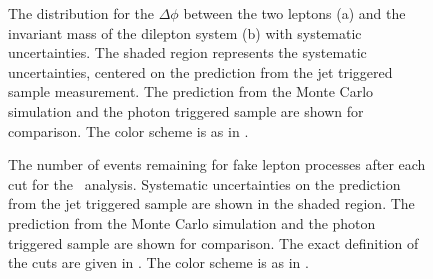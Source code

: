 \documentclass{cmspaper}
\begin{document}
\begin{figure}[htb]
  \begin{center}
    \caption{The distribution for the $\Delta\phi$ between the two leptons (a) and the invariant mass of the dilepton system (b) with systematic uncertainties. The shaded region represents the systematic uncertainties, centered on the prediction from the jet triggered sample measurement. The prediction from the Monte Carlo simulation and the photon triggered sample are shown for comparison. The color  scheme is as in .}
    \label{fig:DeltaPhiDileptonMass_WithSystematics}
  \end{center}
\end{figure}

\begin{figure}[htb]
  \begin{center}
    \caption{The number of events remaining for fake lepton processes after each cut for the \HiggsToWW\ analysis. Systematic uncertainties on the prediction from the jet triggered sample are shown in the shaded region. The prediction from the Monte Carlo simulation and the photon triggered sample are shown for comparison. The exact definition of the cuts are given in . The color  scheme is as in .}
    \label{fig:HWWSelection_WithSystematics}
  \end{center}
\end{figure}
\end{document}

